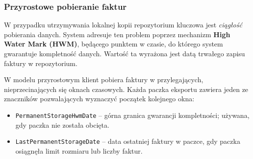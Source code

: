 \subsubsection*{Przyrostowe pobieranie faktur} 

W przypadku utrzymywania lokalnej kopii repozytorium kluczowa jest \textit{ciągłość} pobierania danych. System adresuje ten problem poprzez mechanizm \textbf{High Water Mark (HWM)}, będącego punktem w czasie, do którego system gwarantuje kompletność danych. Wartość ta wyrażona jest datą trwałego zapisu faktury w repozytorium.

W modelu przyrostowym klient pobiera faktury w przylegających, nieprzecinających się oknach czasowych. Każda paczka eksportu zawiera jeden ze znaczników pozwalających wyznaczyć początek kolejnego okna: \cite{ksef-przyrostowe-pobieranie}

\begin{itemize}
    \item \texttt{PermanentStorageHwmDate} -- górna granica gwarancji kompletności; używana, gdy paczka nie została obcięta.
    \item \texttt{LastPermanentStorageDate} -- data ostatniej faktury w paczce, gdy paczka osiągnęła limit rozmiaru lub liczby faktur.
\end{itemize}

